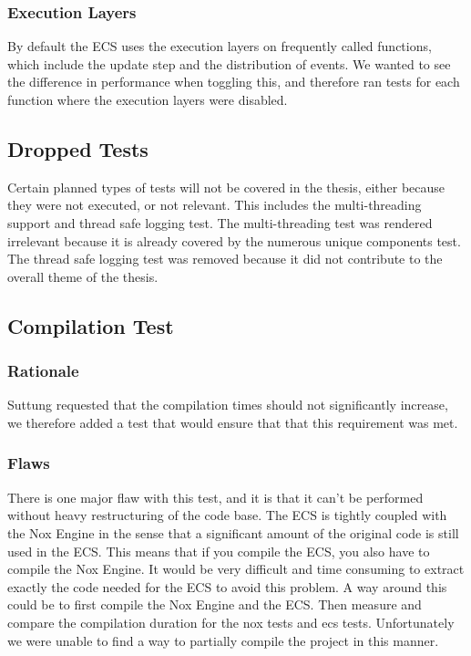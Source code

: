 \subsubsection{Execution Layers}
By default the ECS uses the execution layers on frequently called functions,
which include the update step and the distribution of events.
We wanted to see the difference in performance when toggling this,
and therefore ran tests for each function where the execution layers were disabled.

\subsection{Dropped Tests}
Certain planned types of tests will not be covered in the thesis, either because they were not executed, or not relevant.
This includes the multi-threading support and thread safe logging test.
The multi-threading test was rendered irrelevant because it is already covered by the numerous unique components test.
The thread safe logging test was removed because it did not contribute to the overall theme of the thesis.

\subsection{Compilation Test}
\subsubsection{Rationale}
Suttung requested that the compilation times should not significantly increase,
we therefore added a test that would ensure that that this requirement was met.

\subsubsection{Flaws}
There is one major flaw with this test, and it is that it can't be performed without heavy restructuring of the code base.
The ECS is tightly coupled with the Nox Engine in the sense that a significant amount of the original code is still used in the ECS.
This means that if you compile the ECS, you also have to compile the Nox Engine.
It would be very difficult and time consuming to extract exactly the code needed for the ECS to avoid this problem.
A way around this could be to first compile the Nox Engine and the ECS.
Then measure and compare the compilation duration for the nox tests and ecs tests.
Unfortunately we were unable to find a way to partially compile the project in this manner.


